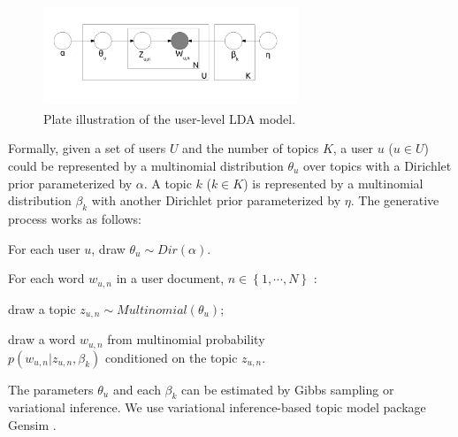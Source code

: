 \documentclass{acm_proc_article-sp}
\begin{document}
\begin{figure}[htb]
\centering
\includegraphics[width=3.0in,height=1.2in]{LDA.pdf}
\caption{Plate illustration of the user-level LDA model.}
\label{fig:graph2}
\end{figure}

Formally, given a set of users $ U $ and the number of topics $ K $, a user $u$ ($ u \in U $) could be represented by a multinomial distribution $ \theta_{u} $ over topics with a Dirichlet prior parameterized by $ \alpha $. 
A topic $ k $ ($ k \in K $) is represented by a multinomial distribution $ \beta_{k} $ with another Dirichlet prior parameterized by $ \eta $. 
The generative process works as follows:
\begin{itemize*}
\item For each user $ u $, draw $ \theta_{u} \sim Dir \left(  \alpha \right) $.
\item For each word $ w_{u,n} $ in a user document, $ n \in \left\lbrace 1, \cdots, N \right\rbrace $ :
\begin{itemize*}
\item draw a topic $ z_{u,n} \sim Multinomial \left( \theta_{u}  \right) $;
\item draw a word $ w_{u,n} $ from multinomial probability\\ $  p \left( w_{u,n} \vert z_{u,n}, \beta_{k}  \right) $ conditioned on the topic $ z_{u,n} $.
\end{itemize*}
\end{itemize*}
The parameters $ \theta_{u} $ and each $ \beta_{k} $ can be estimated by Gibbs sampling or variational inference.
We use variational inference-based topic model package Gensim \cite{rehurek_lrec}.
\end{document}
